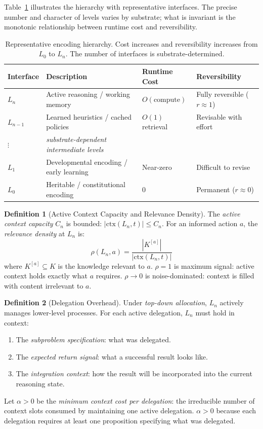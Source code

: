 \documentclass[11pt]{article}
\theoremstyle{definition}
\newtheorem{definition}{Definition}
\begin{document}
Table~\ref{tab:hierarchy} illustrates the hierarchy with representative
interfaces. The precise number and character of levels varies by
substrate; what is invariant is the monotonic relationship between
runtime cost and reversibility.

\begin{table}[h]
\centering
\small
\begin{tabular}{@{}llll@{}}
\toprule
\textbf{Interface} & \textbf{Description} & \textbf{Runtime Cost} &
\textbf{Reversibility} \\
\midrule
$L_n$ & Active reasoning / working memory & $O(\text{compute})$ &
Fully reversible ($r \approx 1$) \\
$L_{n-1}$ & Learned heuristics / cached policies & $O(1)$ retrieval &
Revisable with effort \\
$\vdots$ & \emph{substrate-dependent intermediate levels} & & \\
$L_1$ & Developmental encoding / early learning & Near-zero &
Difficult to revise \\
$L_0$ & Heritable / constitutional encoding & $0$ &
Permanent ($r \approx 0$) \\
\bottomrule
\end{tabular}
\caption{Representative encoding hierarchy. Cost increases and
reversibility increases from $L_0$ to $L_n$. The number of interfaces
is substrate-determined.}
\label{tab:hierarchy}
\end{table}

\begin{definition}[Active Context Capacity and Relevance Density]
\label{def:context}
The \emph{active context capacity} $C_n$ is bounded: $|\mathrm{ctx}(L_n,
t)| \leq C_n$. For an informed action $a$, the \emph{relevance
density} at $L_n$ is:
\[
\rho(L_n, a) = \frac{|K^{[a]}|}{|\mathrm{ctx}(L_n, t)|}
\]
where $K^{[a]} \subseteq K$ is the knowledge relevant to $a$.
$\rho = 1$ is maximum signal: active context holds exactly what $a$
requires. $\rho \to 0$ is noise-dominated: context is filled with
content irrelevant to $a$.
\end{definition}

\begin{definition}[Delegation Overhead]
\label{def:delegation}
Under \emph{top-down allocation}, $L_n$ actively manages lower-level
processes. For each active delegation, $L_n$ must hold in context:
\begin{enumerate}
\item[(i)] The \emph{subproblem specification}: what was delegated.
\item[(ii)] The \emph{expected return signal}: what a successful
   result looks like.
\item[(iii)] The \emph{integration context}: how the result will be
   incorporated into the current reasoning state.
\end{enumerate}
Let $\alpha > 0$ be the \emph{minimum context cost per delegation}:
the irreducible number of context slots consumed by maintaining one
active delegation. $\alpha > 0$ because each delegation requires at
least one proposition specifying what was delegated.
\end{definition}
\end{document}
